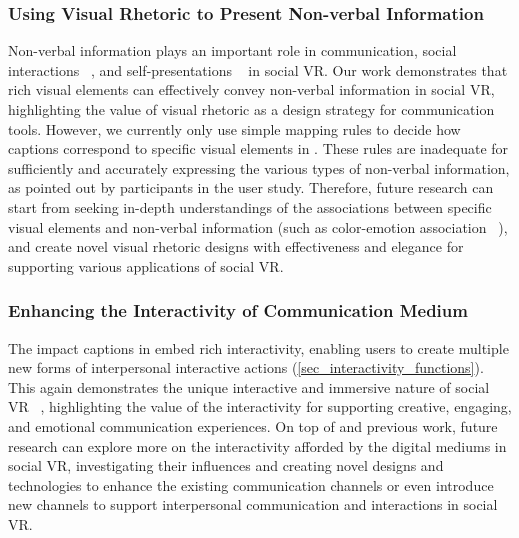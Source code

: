 \subsubsection{Using Visual Rhetoric to Present Non-verbal Information}
Non-verbal information plays an important role in communication, social interactions ~\cite{mcveigh2022beyond, maloney2020talking, aburumman2022nonverbal, liebman2016s}, and self-presentations ~\cite{freeman2021body, sykownik2022something, zhang2022s} in social VR.
Our work demonstrates that rich visual elements can effectively convey non-verbal information in social VR, highlighting the value of visual rhetoric as a design strategy for communication tools.
However, we currently only use simple mapping rules to decide how captions correspond to specific visual elements in \system{}. These rules are inadequate for sufficiently and accurately expressing the various types of non-verbal information, as pointed out by participants in the user study.
Therefore, future research can start from seeking in-depth understandings of the associations between specific visual elements and non-verbal information (such as color-emotion association ~\cite{hanada2018correspondence, wilms2018color}), and create novel visual rhetoric designs with effectiveness and elegance for supporting various applications of social VR.


\subsubsection{Enhancing the Interactivity of Communication Medium}
The impact captions in \system{} embed rich interactivity, enabling users to create multiple new forms of interpersonal interactive actions (\autoref{sec_interactivity_functions}).
This again demonstrates the unique interactive and immersive nature of social VR ~\cite{maloney2020talking}, highlighting the value of the interactivity for supporting creative, engaging, and emotional communication experiences.
On top of \system{} and previous work, future research can explore more on the interactivity afforded by the digital mediums in social VR, investigating their influences and creating novel designs and technologies to enhance the existing communication channels or even introduce new channels to support interpersonal communication and interactions in social VR.




